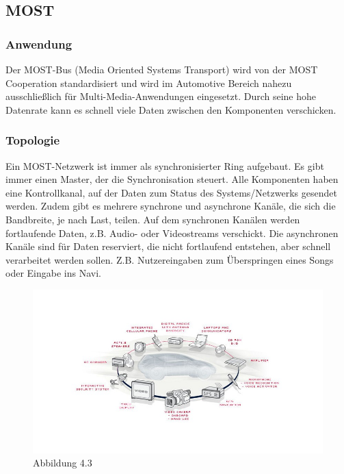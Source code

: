 \subsection{MOST}		
\subsubsection{Anwendung}
Der MOST-Bus (Media Oriented Systems Transport) wird von der MOST Cooperation standardisiert und wird im Automotive Bereich nahezu ausschließlich für Multi-Media-Anwendungen eingesetzt. Durch seine hohe Datenrate kann es schnell viele Daten zwischen den Komponenten verschicken.

\cite{.MH_Vehicle}

\subsubsection{Topologie}
Ein MOST-Netzwerk ist immer als synchronisierter Ring aufgebaut. Es gibt immer einen Master, der die Synchronisation steuert. Alle Komponenten haben eine Kontrollkanal, auf der Daten zum Status des Systems/Netzwerks gesendet werden. Zudem gibt es mehrere synchrone und asynchrone Kanäle, die sich die Bandbreite, je nach Last, teilen.
Auf dem synchronen Kanälen werden fortlaufende Daten, z.B. Audio- oder Videostreams verschickt.
Die asynchronen Kanäle sind für Daten reserviert, die nicht fortlaufend entstehen, aber schnell verarbeitet werden sollen. Z.B. Nutzereingaben zum Überspringen eines Songs oder Eingabe ins Navi.

\cite{.BP01}

\begin{figure}[h!]
	\includegraphics[width=\linewidth]{most_ring.jpg}
	\caption{Abbildung 4.3 \cite{.MH_Ring}}
\end{figure}

